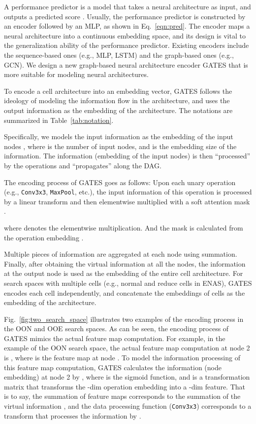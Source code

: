 \documentclass[runningheads]{llncs}
\begin{document}
A performance predictor  is a model that takes a neural architecture  as input, and outputs a predicted score . Usually, the performance predictor is constructed by an encoder followed by an MLP, as shown in Eq.~\ref{eqn:pred}. 
The encoder  maps a neural architecture into a continuous embedding space, and its design is vital to the generalization ability of the performance predictor. Existing encoders include the sequence-based ones (e.g., MLP, LSTM) and the graph-based ones (e.g., GCN). We design a new graph-based neural architecture encoder GATES that is more suitable for modeling neural architectures.




To encode a cell architecture into an embedding vector, GATES follows the ideology of modeling the information flow in the architecture, and uses the output information as the embedding of the architecture. The notations are summarized in Table~\ref{tab:notation}.

Specifically, we models the input information as the embedding of the input nodes , where  is the number of input nodes,
and  is the embedding size of the information.
The information (embedding of the input nodes) is then ``processed'' by the operations and ``propagates'' along the DAG.

The encoding process of GATES goes as follows: Upon each unary operation  (e.g., \texttt{Conv3x3}, \texttt{MaxPool}, etc.), the input information  of this operation is processed by a linear transform  and then elementwise multiplied with a soft attention mask .

where  denotes the elementwise multiplication. And the mask  is calculated from the operation embedding .

Multiple pieces of information are aggregated at each node using summation.
Finally, after obtaining the virtual information at all the nodes, the information at the output node is used as the embedding of the entire cell architecture. For search spaces with multiple cells (e.g., normal and reduce cells in ENAS), GATES encodes each cell independently, and concatenate the embeddings of cells as the embedding of the architecture.



Fig.~\ref{fig:two_search_space} illustrates two examples of the encoding process in the OON and OOE search spaces. As can be seen, the encoding process of GATES mimics the actual feature map computation.
For example, in the example of the OON search space, the actual feature map computation at node 2 is , where  is the feature map at node .
To model the information processing of this feature map computation, GATES calculates the information (node embedding) at node 2 by , where  is the sigmoid function, and  is a transformation matrix that transforms the -dim operation embedding into a -dim feature.
That is to say, the summation of feature maps  corresponds to the summation of the virtual information , and the data processing function  (\texttt{Conv3x3}) corresponds to a transform
 that processes the information  by .
\end{document}
